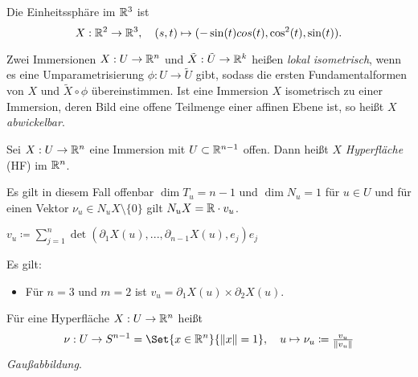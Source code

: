 \documentclass{cheat-sheet}
\begin{document}
\begin{bsp}[Kugelfläche] Die Einheitssphäre im $\mathbb{R}^3$ ist
\[ X : \mathbb{R}^2 \to \mathbb{R}^3, \quad (s, t) \mapsto (- \sin(t) cos(t), \cos^2(t), \sin(t)). \]
\end{bsp}

\begin{definition}
  Zwei Immersionen $X : U \to \mathbb{R}^n$ und $\tilde{X} : \tilde{U} \to \mathbb{R}^k$ heißen \emph{lokal isometrisch}, wenn es eine Umparametrisierung $\phi : U \to \tilde{U}$ gibt, sodass die ersten Fundamentalformen von $X$ und $\tilde{X} \circ \phi$ übereinstimmen. Ist eine Immersion $X$ isometrisch zu einer Immersion, deren Bild eine offene Teilmenge einer affinen Ebene ist, so heißt $X$ \emph{abwickelbar}.
\end{definition}


\begin{definition}
  Sei $X : U \to \mathbb{R}^n$ eine Immersion mit $U \subset \mathbb{R}^{n-1}$ offen. Dann heißt $X$ \emph{Hyperfläche} (HF) im $\mathbb{R}^n$.
\end{definition}

\begin{bem}
  Es gilt in diesem Fall offenbar $\dim T_u = n - 1$ und $\dim N_u = 1$ für $u \in U$ und für einen Vektor $\nu_u \in N_u X \setminus \{ 0 \}$ gilt $N_u X = \mathbb{R} \cdot v_u$.
\end{bem}

\begin{definition}
  $v_u \coloneqq \sum_{j=1}^{n} \det(\partial_1 X(u), ..., \partial_{n-1} X(u), e_j) e_j$
\end{definition}

\begin{bem}
  Es gilt:
  \begin{itemize}
    \item Für $n = 3$ und $m = 2$ ist $v_u = \partial_1 X(u) \times \partial_2 X(u)$.
  \end{itemize}
\end{bem}

\begin{definition}
  Für eine Hyperfläche $X : U \to \mathbb{R}^n$ heißt
  \[ \nu : U \to S^{n-1} = \Set{ x \in \R^n }{ \| x \| = 1 }, \quad u \mapsto \nu_u \coloneqq \tfrac{v_u}{\| v_u \|} \]
  \emph{Gaußabbildung}.
\end{definition}
\end{document}
